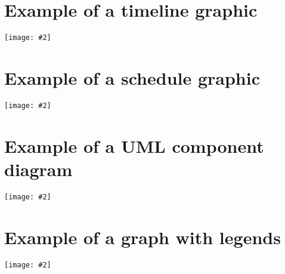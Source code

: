 \documentclass[11pt]{article}
\newcommand{\demonstrate}[2]{%
  \begin{center}
  \texttt{[image: \#2]}
  \end{center}
}
\begin{document}
\section{Example of a timeline graphic}
\demonstrate{height=0.9\textheight}{example_timeline-0}
\section{Example of a schedule graphic}
\demonstrate{width=\textwidth}{example_schedule-0}
\section{Example of a UML component diagram}
\demonstrate{}{example_umlcomponent-0}
\section{Example of a graph with legends}
\demonstrate{}{example_legend-0}
\end{document}

